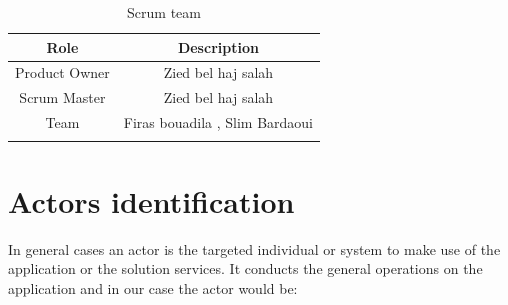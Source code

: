 \documentclass[]{report}
\begin{document}
\begin{table}[H]
	\begin{center}
	\begin{tabular}{cc}
		\hline
		
		\multicolumn{1}{|c|}{\cellcolor[HTML]{5900b3}\color[HTML]{f0e6ff}\textbf{Role}} & \multicolumn{1}{c|}{\cellcolor[HTML]{5900b3}\color[HTML]{f0e6ff}\textbf{Description}}           \\ \hline
		\multicolumn{1}{|c|}{Product Owner} & \multicolumn{1}{c|}{Zied bel haj salah}             \\ \hline
		\multicolumn{1}{|c|}{Scrum Master}  & \multicolumn{1}{c|}{Zied bel haj salah}             \\ \hline
		\multicolumn{1}{|c|}{Team}          & \multicolumn{1}{c|}{Firas bouadila , Slim Bardaoui} \\ \hline \multicolumn{1}{l}{}                               
	\end{tabular}
\end{center}
\caption[Scrum team]{Scrum team}
\end{table}

\section{Actors identification}
In general cases an actor is the targeted individual or
system to make use of the application or the solution
services. It conducts the general operations on the
application and in our case the actor would be:
\end{document}
